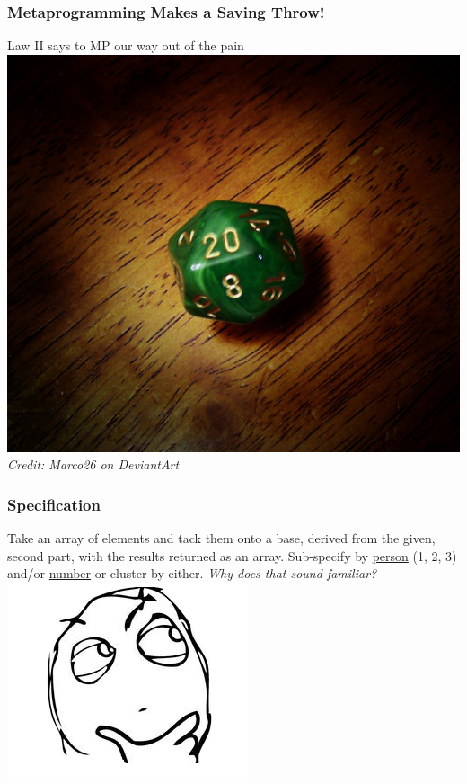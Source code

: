 \documentclass[slidestop,compress,mathserif]{beamer}
\begin{document}
\begin{frame}
	\frametitle{Metaprogramming Makes a Saving Throw!}
	\begin{center}
		Law II says to MP our way out of the pain
		\vskip 1.0cm
		\includegraphics[scale=0.25]{img/natural_20.jpg} \\
		\emph{Credit: Marco26 on DeviantArt}
	\end{center}
\end{frame}

\begin{frame}
	\frametitle{Specification}
	Take an array of elements and tack them onto a base, derived from the given, second part, with the results returned as an array.  Sub-specify by \underline{person} (1, 2, 3) and/or \underline{number} or cluster by either.
	\pause
	\vskip 0.5cm
	\emph{Why does that sound familiar?}
	\vskip 0.5cm
	\includegraphics[scale=0.45]{img/determined.png}
\end{frame}
\end{document}
